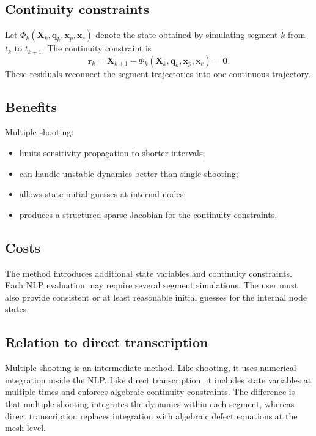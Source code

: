 \documentclass[11pt]{article}
\newcommand{\vect}[1]{\boldsymbol{#1}}
\newcommand{\xp}{\vect{x}_p}
\newcommand{\xc}{\vect{x}_c}
\begin{document}
\subsection{Continuity constraints}

Let $\Phi_k(\vect{X}_k,\vect{q}_k,\xp,\xc)$ denote the state obtained by simulating segment $k$ from $t_k$ to $t_{k+1}$. The continuity constraint is
\begin{equation}
\vect{r}_k=\vect{X}_{k+1}-\Phi_k(\vect{X}_k,\vect{q}_k,\xp,\xc)=\vect{0}.
\label{eq:multiple-shooting-continuity}
\end{equation}
These residuals reconnect the segment trajectories into one continuous trajectory.

\subsection{Benefits}

Multiple shooting:
\begin{itemize}[leftmargin=1.4em]
  \item limits sensitivity propagation to shorter intervals;
  \item can handle unstable dynamics better than single shooting;
  \item allows state initial guesses at internal nodes;
  \item produces a structured sparse Jacobian for the continuity constraints.
\end{itemize}

\subsection{Costs}

The method introduces additional state variables and continuity constraints. Each NLP evaluation may require several segment simulations. The user must also provide consistent or at least reasonable initial guesses for the internal node states.

\subsection{Relation to direct transcription}

Multiple shooting is an intermediate method. Like shooting, it uses numerical integration inside the NLP. Like direct transcription, it includes state variables at multiple times and enforces algebraic continuity constraints. The difference is that multiple shooting integrates the dynamics within each segment, whereas direct transcription replaces integration with algebraic defect equations at the mesh level.
\end{document}
